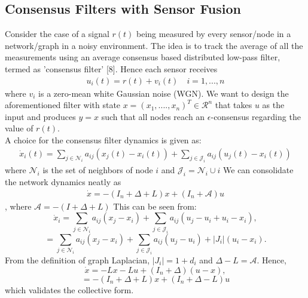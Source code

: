 \documentclass[journal]{IEEEtran}
\begin{document}
\subsection{Consensus Filters with Sensor Fusion}
Consider the case of a signal $r(t)$ being measured by every sensor/node in a network/graph in a noisy environment. The idea is to track the average of all the measurements using an average consensus based distributed low-pass filter, termed as 'consensus filter' [8]. Hence each sensor receives\begin{align} u_i(t) = r(t)+v_i(t)\quad i=1,...,n\end{align} where $v_i$ is a zero-mean white Gaussian noise (WGN). We want to design the aforementioned filter with state $x = (x_1,....,x_n)^T \in \mathcal{R}^n$ that takes $u$ as the input and produces $y = x$ such that all nodes reach an $\epsilon$-consensus regarding the value of $r(t)$.\\ A choice for the consensus filter dynamics is given as: \begin{align} \dot{x}_i(t) = \sum_{j\in \mathcal{N}_i} a_{ij}(x_j(t)-x_i(t)) + \sum_{j \in \mathcal{J}_i} a_{ij}(u_j(t)-x_i(t)) \end{align} where $\mathcal{N}_i$ is the set of neighbors of node $i$ and $\mathcal{J}_i = \mathcal{N}_i \cup i$ 
We can consolidate the network dynamics neatly as \begin{align} \dot{x} = -(I_n+ \Delta + L)x + (I_n+\mathcal{A})u\end{align}, where $\mathcal{A} = -(I+ \Delta + L)$ This can be seen from: $$ \dot{x}_i = \sum_{j\in \mathcal{N}_i} a_{ij}(x_j-x_i) + \sum_{j \in \mathcal{J}_i} a_{ij}(u_j-u_i+u_i-x_i),$$ $$= \sum_{j\in \mathcal{N}_i} a_{ij}(x_j-x_i) + \sum_{j \in \mathcal{J}_i} a_{ij}(u_j-u_i) + |J_i|(u_i-x_i).$$ From the definition of graph Laplacian, $|J_i| = 1+d_i$ and $\Delta - L = \mathcal{A}$. Hence, $$\dot{x} = -Lx-Lu+(I_n+\Delta)(u-x),$$$$=-(I_n+\Delta+L)x+(I_n+\Delta-L)u$$ which validates the collective form.\\\\
\end{document}
